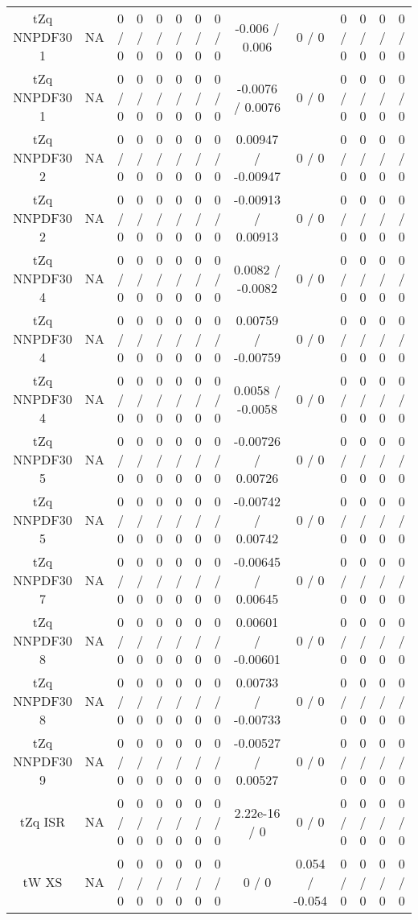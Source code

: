 \documentclass[10pt]{article}
\begin{document}
\begin{table}[htbp]
\begin{center}
\begin{tabular}{|c|c|c|c|c|c|c|c|c|c|c|c|c|c|}
  tZq NNPDF30 1 &    NA    & 0 / 0 & 0 / 0 & 0 / 0 & 0 / 0 & 0 / 0 & 0 / 0 & -0.006 / 0.006 & 0 / 0 & 0 / 0 & 0 / 0 & 0 / 0 & 0 / 0 \\ 
  tZq NNPDF30 1 &    NA    & 0 / 0 & 0 / 0 & 0 / 0 & 0 / 0 & 0 / 0 & 0 / 0 & -0.0076 / 0.0076 & 0 / 0 & 0 / 0 & 0 / 0 & 0 / 0 & 0 / 0 \\ 
  tZq NNPDF30 2 &    NA    & 0 / 0 & 0 / 0 & 0 / 0 & 0 / 0 & 0 / 0 & 0 / 0 & 0.00947 / -0.00947 & 0 / 0 & 0 / 0 & 0 / 0 & 0 / 0 & 0 / 0 \\ 
  tZq NNPDF30 2 &    NA    & 0 / 0 & 0 / 0 & 0 / 0 & 0 / 0 & 0 / 0 & 0 / 0 & -0.00913 / 0.00913 & 0 / 0 & 0 / 0 & 0 / 0 & 0 / 0 & 0 / 0 \\ 
  tZq NNPDF30 4 &    NA    & 0 / 0 & 0 / 0 & 0 / 0 & 0 / 0 & 0 / 0 & 0 / 0 & 0.0082 / -0.0082 & 0 / 0 & 0 / 0 & 0 / 0 & 0 / 0 & 0 / 0 \\ 
  tZq NNPDF30 4 &    NA    & 0 / 0 & 0 / 0 & 0 / 0 & 0 / 0 & 0 / 0 & 0 / 0 & 0.00759 / -0.00759 & 0 / 0 & 0 / 0 & 0 / 0 & 0 / 0 & 0 / 0 \\ 
  tZq NNPDF30 4 &    NA    & 0 / 0 & 0 / 0 & 0 / 0 & 0 / 0 & 0 / 0 & 0 / 0 & 0.0058 / -0.0058 & 0 / 0 & 0 / 0 & 0 / 0 & 0 / 0 & 0 / 0 \\ 
  tZq NNPDF30 5 &    NA    & 0 / 0 & 0 / 0 & 0 / 0 & 0 / 0 & 0 / 0 & 0 / 0 & -0.00726 / 0.00726 & 0 / 0 & 0 / 0 & 0 / 0 & 0 / 0 & 0 / 0 \\ 
  tZq NNPDF30 5 &    NA    & 0 / 0 & 0 / 0 & 0 / 0 & 0 / 0 & 0 / 0 & 0 / 0 & -0.00742 / 0.00742 & 0 / 0 & 0 / 0 & 0 / 0 & 0 / 0 & 0 / 0 \\ 
  tZq NNPDF30 7 &    NA    & 0 / 0 & 0 / 0 & 0 / 0 & 0 / 0 & 0 / 0 & 0 / 0 & -0.00645 / 0.00645 & 0 / 0 & 0 / 0 & 0 / 0 & 0 / 0 & 0 / 0 \\ 
  tZq NNPDF30 8 &    NA    & 0 / 0 & 0 / 0 & 0 / 0 & 0 / 0 & 0 / 0 & 0 / 0 & 0.00601 / -0.00601 & 0 / 0 & 0 / 0 & 0 / 0 & 0 / 0 & 0 / 0 \\ 
  tZq NNPDF30 8 &    NA    & 0 / 0 & 0 / 0 & 0 / 0 & 0 / 0 & 0 / 0 & 0 / 0 & 0.00733 / -0.00733 & 0 / 0 & 0 / 0 & 0 / 0 & 0 / 0 & 0 / 0 \\ 
  tZq NNPDF30 9 &    NA    & 0 / 0 & 0 / 0 & 0 / 0 & 0 / 0 & 0 / 0 & 0 / 0 & -0.00527 / 0.00527 & 0 / 0 & 0 / 0 & 0 / 0 & 0 / 0 & 0 / 0 \\ 
  tZq ISR &    NA    & 0 / 0 & 0 / 0 & 0 / 0 & 0 / 0 & 0 / 0 & 0 / 0 & 2.22e-16 / 0 & 0 / 0 & 0 / 0 & 0 / 0 & 0 / 0 & 0 / 0 \\ 
  tW XS &    NA    & 0 / 0 & 0 / 0 & 0 / 0 & 0 / 0 & 0 / 0 & 0 / 0 & 0 / 0 & 0.054 / -0.054 & 0 / 0 & 0 / 0 & 0 / 0 & 0 / 0 \\ 

\end{tabular}
\end{center}
\end{table}
\end{document}
